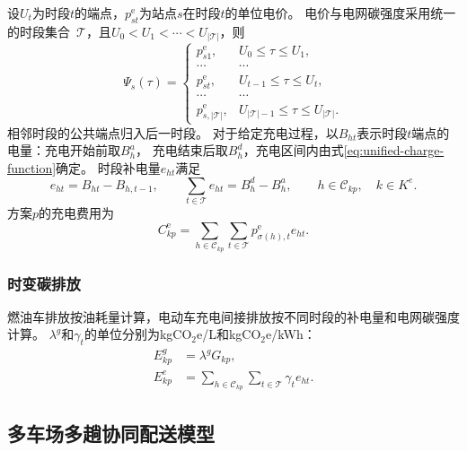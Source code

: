 设$U_t$为时段$t$的端点，$p_{st}^{\mathrm e}$为站点$s$在时段$t$的单位电价。
电价与电网碳强度采用统一的时段集合~$\mathcal T$，且$U_0<U_1<\cdots<U_{|\mathcal T|}$\cite{ref:94}，则
\begin{equation}
\Psi_s(\tau)=
\begin{cases}
p_{s1}^{\mathrm e}, & U_0\le\tau\le U_1,\\
\cdots & \cdots\\
p_{st}^{\mathrm e}, & U_{t-1}\le\tau\le U_t,\\
\cdots & \cdots\\
p_{s,|\mathcal T|}^{\mathrm e}, & U_{|\mathcal T|-1}\le\tau\le U_{|\mathcal T|}.
\end{cases}
\label{eq:unified-price-function}
\end{equation}
相邻时段的公共端点归入后一时段。
对于给定充电过程，以$B_{ht}$表示时段$t$端点的电量：充电开始前取$B_h^{a}$，
充电结束后取$B_h^{d}$，充电区间内由式\eqref{eq:unified-charge-function}确定。
时段补电量$e_{ht}$满足\cite{ref:94}
\begin{equation}
e_{ht}=B_{ht}-B_{h,t-1},\qquad
\sum_{t\in\mathcal T}e_{ht}=B_h^{d}-B_h^{a},\qquad
h\in\mathcal C_{kp},\quad k\in K^{e}.
\label{eq:unified-charge-balance}
\end{equation}
方案$p$的充电费用为
\begin{equation}
C_{kp}^{\mathrm e}
=\sum_{h\in\mathcal C_{kp}}\sum_{t\in\mathcal T}
p_{\sigma(h),t}^{\mathrm e}e_{ht}.
\label{eq:unified-charge-cost}
\end{equation}

\subsubsection{时变碳排放}

燃油车排放按油耗量计算，电动车充电间接排放按不同时段的补电量和电网碳强度计算\cite{ref:deng}。
$\lambda^{g}$和$\gamma_t$的单位分别为kgCO$_2$e/L和kgCO$_2$e/kWh：
\begin{align}
E_{kp}^{g}&=\lambda^{g}G_{kp},
\label{eq:unified-direct-emission}\\
E_{kp}^{e}&=\sum_{h\in\mathcal C_{kp}}\sum_{t\in\mathcal T}\gamma_t e_{ht}.
\label{eq:unified-indirect-emission}
\end{align}

\subsection{多车场多趟协同配送模型}

